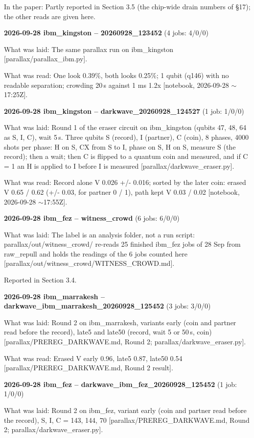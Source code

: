 \documentclass[11pt]{article}
\begin{document}
In the paper: Partly reported in Section 3.5 (the chip-wide drain numbers of \S{}17); the other reads are given here.

\textbf{2026-09-28 ibm\_kingston -- 20260928\_123452} (4 jobs: 4/0/0)

What was laid: The same parallax run on ibm\_kingston {[}parallax/parallax\_ibm.py{]}.

What was read: One look 0.39\%, both looks 0.25\%; 1 qubit (q146) with no readable separation; crowding 20\,\textmu s against 1 ms 1.2x {[}notebook, 2026-09-28 \(\sim\)17:25Z{]}.

\textbf{2026-09-28 ibm\_kingston -- darkwave\_20260928\_124527} (1 job: 1/0/0)

What was laid: Round 1 of the eraser circuit on ibm\_kingston (qubits 47, 48, 64 as S, I, C), wait 5\,\textmu s. Three qubits S (record), I (partner), C (coin), 8 phases, 4000 shots per phase: H on S, CX from S to I, phase on S, H on S, measure S (the record); then a wait; then C is flipped to a quantum coin and measured, and if C = 1 an H is applied to I before I is measured {[}parallax/darkwave\_eraser.py{]}.

What was read: Record alone V 0.026 +/- 0.016; sorted by the later coin: erased V 0.65 / 0.62 (+/- 0.03, for partner 0 / 1), path kept V 0.03 / 0.02 {[}notebook, 2026-09-28 \(\sim\)17:55Z{]}.

\textbf{2026-09-28 ibm\_fez -- witness\_crowd} (6 jobs: 6/0/0)

What was laid: The label is an analysis folder, not a run script: parallax/out/witness\_crowd/ re-reads 25 finished ibm\_fez jobs of 28 Sep from raw\_repull and holds the readings of the 6 jobs counted here {[}parallax/out/witness\_crowd/WITNESS\_CROWD.md{]}.

Reported in Section 3.4.

\textbf{2026-09-28 ibm\_marrakesh -- darkwave\_ibm\_marrakesh\_20260928\_125452} (3 jobs: 3/0/0)

What was laid: Round 2 on ibm\_marrakesh, variants early (coin and partner read before the record), late5 and late50 (record, wait 5 or 50\,\textmu s, coin) {[}parallax/PREREG\_DARKWAVE.md, Round 2; parallax/darkwave\_eraser.py{]}.

What was read: Erased V early 0.96, late5 0.87, late50 0.54 {[}parallax/PREREG\_DARKWAVE.md, Round 2 result{]}.

\textbf{2026-09-28 ibm\_fez -- darkwave\_ibm\_fez\_20260928\_125452} (1 job: 1/0/0)

What was laid: Round 2 on ibm\_fez, variant early (coin and partner read before the record), S, I, C = 143, 144, 70 {[}parallax/PREREG\_DARKWAVE.md, Round 2; parallax/darkwave\_eraser.py{]}.
\end{document}
